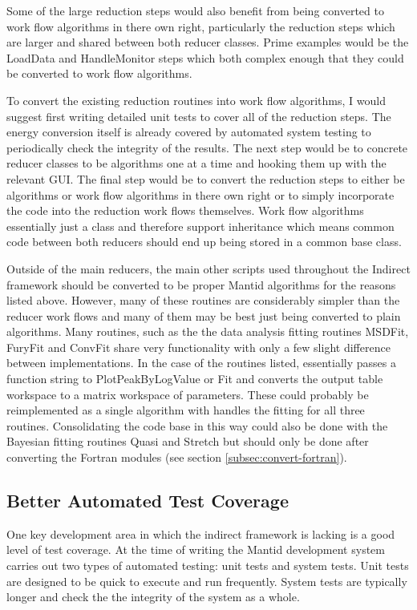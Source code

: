 \documentclass[paper=a4, fontsize=11pt]{scrartcl}	%
\numberwithin{equation}{section}															%
\numberwithin{figure}{section}																%
\numberwithin{table}{section}																%
\begin{document}
Some of the large reduction steps would also benefit from being converted to work flow algorithms in there own right, particularly the reduction steps which are larger and shared between both reducer classes. Prime examples would be the LoadData and HandleMonitor steps which both complex enough that they could be converted to work flow algorithms.

To convert the existing reduction routines into work flow algorithms, I would suggest first writing detailed unit tests to cover all of the reduction steps. The energy conversion itself is already covered by automated system testing to periodically check the integrity of the results. The next step would be to concrete reducer classes to be algorithms one at a time and hooking them up with the relevant GUI. The final step would be to convert the reduction steps to either be algorithms or work flow algorithms in there own right or to simply incorporate the code into the reduction work flows themselves. Work flow algorithms essentially just a class and therefore support inheritance which means common code between both reducers should end up being stored in a common base class.

Outside of the main reducers, the main other scripts used throughout the Indirect framework should be converted to be proper Mantid algorithms for the reasons listed above. However, many of these routines are considerably simpler than the reducer work flows and many of them may be best just being converted to plain algorithms. Many routines, such as the the data analysis fitting routines MSDFit, FuryFit and ConvFit share very functionality with only a few slight difference between implementations. In the case of the routines listed, essentially passes a function string to PlotPeakByLogValue or Fit and converts the output table workspace to a matrix workspace of parameters. These could probably be reimplemented as a single algorithm with handles the fitting for all three routines. Consolidating the code base in this way could also be done with the Bayesian fitting routines Quasi and Stretch but should only be done after converting the Fortran modules (see section \ref{subsec:convert-fortran}).

\subsection{Better Automated Test Coverage}
One key development area in which the indirect framework is lacking is a good level of test coverage. At the time of writing the Mantid development system carries out two types of automated testing: unit tests and system tests. Unit tests are designed to be quick to execute and run frequently. System tests are typically longer and check the the integrity of the system as a whole.
\end{document}
